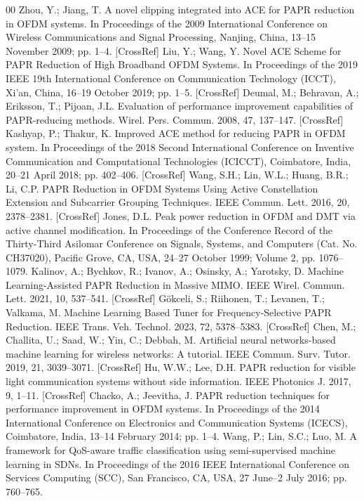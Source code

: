 \documentclass[conference]{IEEEtran}
\begin{document}
\begin{thebibliography}{00}
 Zhou, Y.; Jiang, T. A novel clipping integrated into ACE for PAPR reduction in OFDM systems. In Proceedings of the 2009 International Conference on Wireless Communications and Signal Processing, Nanjing, China, 13–15 November 2009; pp. 1–4. [CrossRef]
 Liu, Y.; Wang, Y. Novel ACE Scheme for PAPR Reduction of High Broadband OFDM Systems. In Proceedings of the 2019 IEEE 19th International Conference on Communication Technology (ICCT), Xi’an, China, 16–19 October 2019; pp. 1–5. [CrossRef]
 Deumal, M.; Behravan, A.; Eriksson, T.; Pijoan, J.L. Evaluation of performance improvement capabilities of PAPR-reducing methods. Wirel. Pers. Commun. 2008, 47, 137–147. [CrossRef]
 Kashyap, P.; Thakur, K. Improved ACE method for reducing PAPR in OFDM system. In Proceedings of the 2018 Second International Conference on Inventive Communication and Computational Technologies (ICICCT), Coimbatore, India, 20–21 April 2018; pp. 402–406. [CrossRef]
 Wang, S.H.; Lin, W.L.; Huang, B.R.; Li, C.P. PAPR Reduction in OFDM Systems Using Active Constellation Extension and Subcarrier Grouping Techniques. IEEE Commun. Lett. 2016, 20, 2378–2381. [CrossRef]
 Jones, D.L. Peak power reduction in OFDM and DMT via active channel modification. In Proceedings of the Conference Record of the Thirty-Third Asilomar Conference on Signals, Systems, and Computers (Cat. No. CH37020), Pacific Grove, CA, USA, 24–27 October 1999; Volume 2, pp. 1076–1079.
 Kalinov, A.; Bychkov, R.; Ivanov, A.; Osinsky, A.; Yarotsky, D. Machine Learning-Assisted PAPR Reduction in Massive MIMO. IEEE Wirel. Commun. Lett. 2021, 10, 537–541. [CrossRef]
 Gökceli, S.; Riihonen, T.; Levanen, T.; Valkama, M. Machine Learning Based Tuner for Frequency-Selective PAPR Reduction. IEEE Trans. Veh. Technol. 2023, 72, 5378–5383. [CrossRef]
 Chen, M.; Challita, U.; Saad, W.; Yin, C.; Debbah, M. Artificial neural networks-based machine learning for wireless networks: A tutorial. IEEE Commun. Surv. Tutor. 2019, 21, 3039–3071. [CrossRef]
 Hu, W.W.; Lee, D.H. PAPR reduction for visible light communication systems without side information. IEEE Photonics J. 2017, 9, 1–11. [CrossRef]
 Chacko, A.; Jeevitha, J. PAPR reduction techniques for performance improvement in OFDM systems. In Proceedings of the 2014 International Conference on Electronics and Communication Systems (ICECS), Coimbatore, India, 13–14 February 2014; pp. 1–4.
 Wang, P.; Lin, S.C.; Luo, M. A framework for QoS-aware traffic classification using semi-supervised machine learning in SDNs. In Proceedings of the 2016 IEEE International Conference on Services Computing (SCC), San Francisco, CA, USA, 27 June–2 July 2016; pp. 760–765.

\end{thebibliography}
\end{document}
